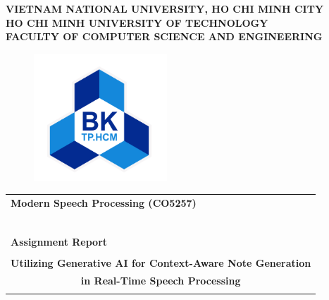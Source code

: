 \documentclass[12pt,a4paper]{article}
\begin{document}
\begin{titlepage}

    \begin{center}
        \large \textbf{VIETNAM NATIONAL UNIVERSITY, HO CHI MINH CITY} \\
        \large \textbf{HO CHI MINH UNIVERSITY OF TECHNOLOGY} \\
        \large \textbf{FACULTY OF COMPUTER SCIENCE AND ENGINEERING}
    \end{center}

    \begin{figure}[h!]
        \begin{center}
            \includegraphics[width=5cm]{Images/hcmut.png}
        \end{center}
    \end{figure}

    \begin{center}
        \begin{tabular}{c}
        \multicolumn{1}{l}{\textbf{{\Large Modern Speech Processing (CO5257)}}}\\
        ~~\\
        \hline
        \\
        \multicolumn{1}{l}{\textbf{{\Large Assignment Report}}}\\
        \\
        \textbf{{\Large Utilizing Generative AI for Context-Aware Note
        Generation}}\\
        \textbf{{\Large in Real-Time Speech Processing}}\\
        \\
        \hline
        \end{tabular}
        \end{center}


\end{titlepage}
\end{document}
